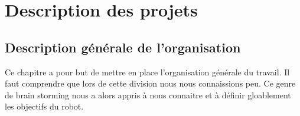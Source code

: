 \documentclass[a4paper,10pt]{report}
\begin{document}
\begin{spacing}{1.5}
\begin{titlepage}
\begin{sffamily}
\begin{center}
  \end{center}
  \end{sffamily}
\end{titlepage}
\setcounter{tocdepth}{2}
\tableofcontents
\newpage
\pagestyle{fancy}
\rhead{\thepage}

 \setcounter{part}{1}
\part{Description des projets}
\chapter{Description générale de l'organisation}
Ce chapitre a pour but de mettre en place l'organisation générale du travail. Il
faut comprendre que lors de cette division nous nous connaissions peu. Ce genre
de brain storming nous a alors appris à nous connaitre et à définir gloablement
les objectifs du robot.

\end{spacing}
\end{document}

